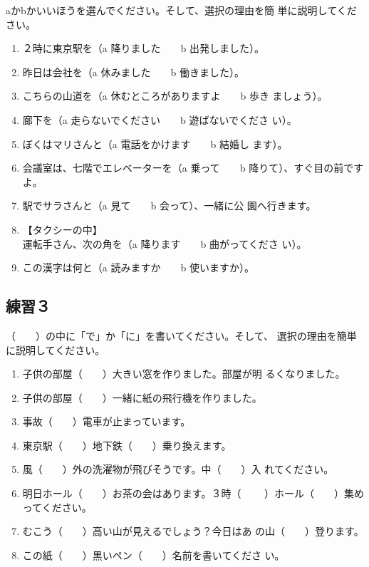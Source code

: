 \documentclass{tufte-handout}
\begin{document}
aかbかいいほうを選んでください。そして、選択の理由を簡
単に説明してください。

\begin{enumerate}
  \item ２時に東京駅を（a 降りました　　b 出発しました）。
  \item 昨日は会社を（a 休みました　　b 働きました）。
  \item こちらの山道を（a 休むところがありますよ　　b 歩き
    ましょう）。
  \item 廊下を（a 走らないでください　　b 遊ばないでくださ
    い）。
  \item ぼくはマリさんと（a 電話をかけます　　b 結婚し
    ます）。
  \item 会議室は、七階でエレベーターを（a 乗って　　b
    降りて）、すぐ目の前ですよ。
  \item 駅でサラさんと（a 見て　　b 会って）、一緒に公
    園へ行きます。
  \item 【タクシーの中】\\
    運転手さん、次の角を（a 降ります　　b 曲がってくださ
    い）。
  \item この漢字は何と（a 読みますか　　b 使いますか）。
\end{enumerate}


\subsection{練習３}%
\label{sub:renshuu_3}

（　　）の中に「で」か「に」を書いてください。そして、
選択の理由を簡単に説明してください。

\begin{enumerate}
  \item 子供の部屋（　　）大きい窓を作りました。部屋が明
    るくなりました。
  \item 子供の部屋（　　）一緒に紙の飛行機を作りました。
  \item 事故（　　）電車が止まっています。
  \item 東京駅（　　）地下鉄（　　）乗り換えます。
  \item 風（　　）外の洗濯物が飛びそうです。中（　　）入
    れてください。
  \item 明日ホール（　　）お茶の会はあります。３時（
    　　）ホール（　　）集めってください。
  \item むこう（　　）高い山が見えるでしょう？今日はあ
    の山（　　）登ります。
  \item この紙（　　）黒いペン（　　）名前を書いてくださ
    い。
\end{enumerate}
\end{document}
